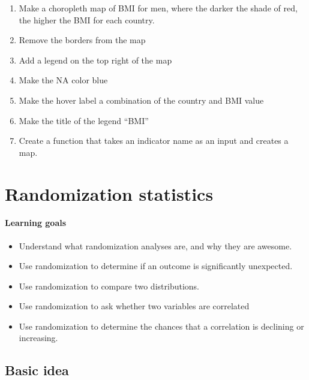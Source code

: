 \documentclass[
]{book}
\providecommand{\tightlist}{%
  \setlength{\itemsep}{0pt}\setlength{\parskip}{0pt}}
\begin{document}
\begin{enumerate}
\def\labelenumi{\arabic{enumi}.}
\item
  Make a choropleth map of BMI for men, where the darker the shade of red, the higher the BMI for each country.
\item
  Remove the borders from the map
\item
  Add a legend on the top right of the map
\item
  Make the NA color blue
\item
  Make the hover label a combination of the country and BMI value
\item
  Make the title of the legend ``BMI''
\item
  Create a function that takes an indicator name as an input and creates a map.
\end{enumerate}

\hypertarget{randomization-statistics}{%
\chapter{Randomization statistics}\label{randomization-statistics}}

\hypertarget{learning-goals-24}{%
\subsubsection*{Learning goals}\label{learning-goals-24}}

\begin{itemize}
\tightlist
\item
  Understand what randomization analyses are, and why they are awesome.
\item
  Use randomization to determine if an outcome is significantly unexpected.
\item
  Use randomization to compare two distributions.
\item
  Use randomization to ask whether two variables are correlated
\item
  Use randomization to determine the chances that a correlation is declining or increasing.
\end{itemize}

\hypertarget{basic-idea}{%
\section*{Basic idea}\label{basic-idea}}
\end{document}
